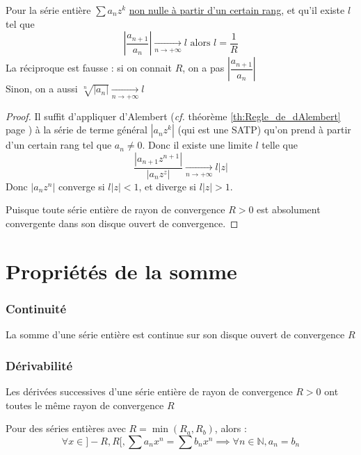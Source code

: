 \documentclass[11pt,a4paper,fleqn,pdftex]{report}
\begin{document}
\begin{itheorem}
Pour la série entière $\sum a_n z^{k}$ \uline{non nulle à partir d'un certain rang}, et qu'il existe $l$ tel que 
\[
\boxed{\left|\dfrac{a_{n+1}}{a_n}\right|\xrightarrow[n\to +\infty]{}l} \text{ alors } l = \frac{1}{R}
\]
La réciproque est fausse : si on connait $R$, on a pas $\left|\dfrac{a_{n+1}}{a_n}\right|$\\
Sinon, on a aussi $\sqrt[n]{|a_n|}\xrightarrow[n\to +\infty]{}l$
\end{itheorem}

\begin{proof}
Il suffit d'appliquer d'Alembert (\textit{cf.} théorème \ref{th:Regle_de_dAlembert} page \pageref{th:Regle_de_dAlembert}) à la série de terme général $|a_n z^k|$ (qui est une \gls{SATP}) qu'on prend à partir d'un certain rang tel que $a_n \neq 0$. Donc il existe une limite $l$ telle que \[\dfrac{|a_{n+1}z^{n+1}|}{|a_nz^z|}\xrightarrow[n\to +\infty]{} l|z|\]
Donc $|a_nz^n|$ converge si $l|z| < 1$, et diverge si $l|z| > 1$.
\par
Puisque toute série entière de rayon de convergence $R>0$ est absolument convergente dans son disque ouvert de convergence.
\end{proof}

\section{Propriétés de la somme}
\subsubsection*{Continuité}
\begin{theorem}
La somme d'une série entière est continue sur son disque ouvert de convergence $R$
\end{theorem}
\subsubsection*{Dérivabilité}
\begin{theorem}
Les dérivées successives d'une série entière de rayon de convergence $R>0$ ont toutes le même rayon de convergence $R$
\end{theorem}
\begin{theorem}
Pour des séries entières avec $R = \min (R_a,R_b)$, alors : 
\[
\forall x \in ]-R,R[, \sum a_n x^n = \sum b_n x^n \implies \forall n \in \mathbb{N}, a_n = b_n
\]
\end{theorem}
\end{document}
